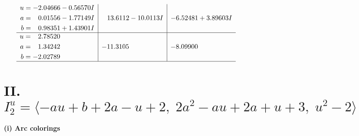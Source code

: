 \documentclass[1p]{elsarticle_modified}
\theoremstyle{definition}
\begin{document}
$$\begin{array}{c|c|c}
\begin{aligned}
u &= -2.04666 - 0.56570 I \\
a &= \phantom{-}0.01556 - 1.77149 I \\
b &= \phantom{-}0.98351 + 1.43901 I\end{aligned}
 & \phantom{-}13.6112 - 10.0113 I & -6.52481 + 3.89603 I \\ \hline\begin{aligned}
u &= \phantom{-}2.78520\phantom{ +0.000000I} \\
a &= \phantom{-}1.34242\phantom{ +0.000000I} \\
b &= -2.02789\phantom{ +0.000000I}\end{aligned}
 & -11.3105\phantom{ +0.000000I} & -8.09900\phantom{ +0.000000I}\\
 \hline 
 \end{array}$$\newpage\newpage\renewcommand{\arraystretch}{1}
\centering \section*{II. $I^u_{2}= \langle - a u+b+2 a- u+2,\;2 a^2- a u+2 a+u+3,\;u^2-2 \rangle$}
\flushleft \textbf{(i) Arc colorings}\\
\end{document}
